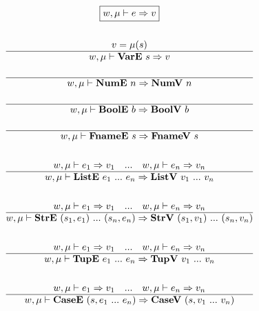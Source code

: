 \newpage


\begin{gather*}
  \boxed{w, \mu \vdash e \Rightarrow v} \\
%
\newline \\
  v = \mu(s) \\
  \hline
  w, \mu \vdash \vare ~ s \Rightarrow v \\
%
\newline \\
  \hline
  w, \mu \vdash \nume ~ n \Rightarrow \numv ~ n \\
%
\newline \\
  \hline
  w, \mu \vdash \boole ~ b \Rightarrow \boolv ~ b \\
%
\newline \\
  \hline
  w, \mu \vdash \fnamee ~ s \Rightarrow \fnamev ~ s \\
%
\newline \\
  w, \mu \vdash e_1 \Rightarrow v_1 \quad ... \quad
  w, \mu \vdash e_n \Rightarrow v_n \\
  \hline
  w, \mu \vdash \liste ~ e_1 ~ ... ~ e_n \Rightarrow \listv ~ v_1 ~ ... ~ v_n \\
%
\newline \\
  w, \mu \vdash e_1 \Rightarrow v_1 \quad ... \quad
  w, \mu \vdash e_n \Rightarrow v_n \\
  \hline
  w, \mu \vdash \stre ~ (s_1, e_1) ~ ... ~ (s_n, e_n) \Rightarrow
  \strv ~ (s_1, v_1) ~ ... ~ (s_n, v_n) \\
%
\newline \\
  w, \mu \vdash e_1 \Rightarrow v_1 \quad ... \quad
  w, \mu \vdash e_n \Rightarrow v_n \\
  \hline
  w, \mu \vdash \tupe ~ e_1 ~ ... ~ e_n \Rightarrow \tupv ~ v_1 ~ ... ~ v_n \\
%
\newline \\
  w, \mu \vdash e_1 \Rightarrow v_1 \quad ... \quad
  w, \mu \vdash e_n \Rightarrow v_n \\
  \hline
  w, \mu \vdash \casee ~ (s, e_1 ~ ... ~ e_n) \Rightarrow \casev ~ (s, v_1 ~ ... ~ v_n) \\
%
\newline \\

\end{gather*}
